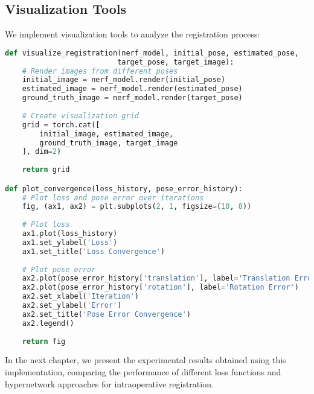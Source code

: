 \subsection{Visualization Tools}
We implement visualization tools to analyze the registration process:

\begin{lstlisting}[language=Python]
def visualize_registration(nerf_model, initial_pose, estimated_pose, 
                          target_pose, target_image):
    # Render images from different poses
    initial_image = nerf_model.render(initial_pose)
    estimated_image = nerf_model.render(estimated_pose)
    ground_truth_image = nerf_model.render(target_pose)
    
    # Create visualization grid
    grid = torch.cat([
        initial_image, estimated_image, 
        ground_truth_image, target_image
    ], dim=2)
    
    return grid

def plot_convergence(loss_history, pose_error_history):
    # Plot loss and pose error over iterations
    fig, (ax1, ax2) = plt.subplots(2, 1, figsize=(10, 8))
    
    # Plot loss
    ax1.plot(loss_history)
    ax1.set_ylabel('Loss')
    ax1.set_title('Loss Convergence')
    
    # Plot pose error
    ax2.plot(pose_error_history['translation'], label='Translation Error')
    ax2.plot(pose_error_history['rotation'], label='Rotation Error')
    ax2.set_xlabel('Iteration')
    ax2.set_ylabel('Error')
    ax2.set_title('Pose Error Convergence')
    ax2.legend()
    
    return fig
\end{lstlisting}

In the next chapter, we present the experimental results obtained using this implementation, comparing the performance of different loss functions and hypernetwork approaches for intraoperative registration. 